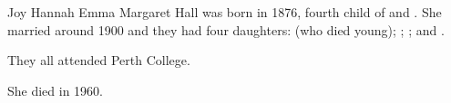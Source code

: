 
Joy Hannah Emma Margaret Hall was born in 1876, fourth child of  and . She married  around 1900 and they had four daughters:
 (who died young);
;
; and
.

They all attended Perth College.\cite{WestAusSocialNotes1913}

She died in 1960.
